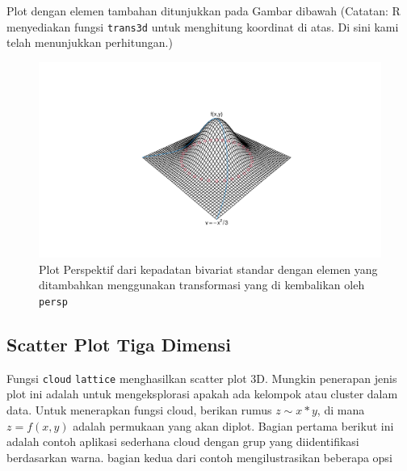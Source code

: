 \documentclass[a4paper,12pt]{article}
\theoremstyle{definition}
\begin{document}
Plot dengan elemen tambahan ditunjukkan pada Gambar dibawah (Catatan: R menyediakan fungsi \texttt{trans3d} untuk menghitung koordinat di atas. Di sini kami telah menunjukkan perhitungan.)
\begin{figure}[H]
    \centering
    \includegraphics[width=16cm]{gb/K2G5-Scatterplot.pdf}
    \caption{Plot Perspektif dari kepadatan bivariat standar dengan elemen yang ditambahkan menggunakan transformasi yang di kembalikan oleh \texttt{persp}}
    \label{fig:my_label}
\end{figure}

\subsection{Scatter Plot Tiga Dimensi}

Fungsi \texttt{cloud} \texttt{lattice} \cite{Sarkar2008} menghasilkan scatter plot 3D. Mungkin penerapan jenis plot ini adalah untuk mengeksplorasi apakah ada kelompok atau cluster dalam data. Untuk menerapkan fungsi cloud, berikan rumus $z \sim  x* y$, di mana $z = f(x, y)$ adalah permukaan yang akan diplot. Bagian pertama berikut ini
adalah contoh aplikasi sederhana cloud dengan grup yang diidentifikasi berdasarkan warna. 
bagian kedua dari contoh mengilustrasikan beberapa opsi
\end{document}
